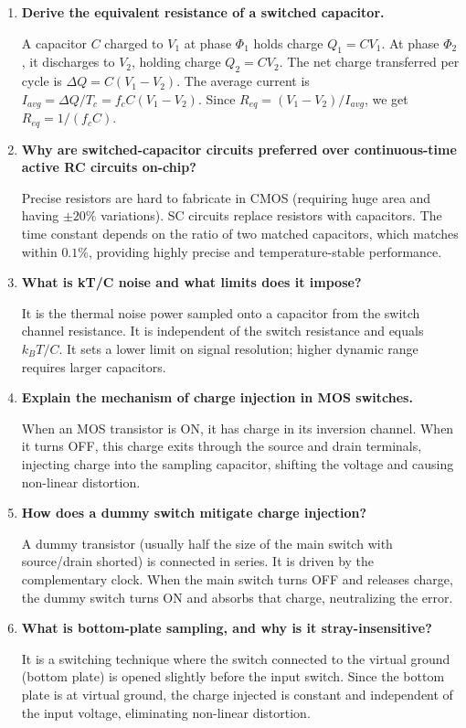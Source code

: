 \documentclass[12pt,a4paper]{article}
\newcommand{\Q}[1]{\textbf{#1}\par\noindent\ignorespaces}
\begin{document}
\begin{tcolorbox}[exambox, title={\textbf{Frequently Asked / Viva Questions}}]
\begin{enumerate}[topsep=0pt, label=\textbf{Q\arabic*.}, itemsep=5pt]
  \item \Q{Derive the equivalent resistance of a switched capacitor.}
    A capacitor $C$ charged to $V_1$ at phase $\Phi_1$ holds charge $Q_1 = C V_1$. At phase $\Phi_2$, it discharges to $V_2$, holding charge $Q_2 = C V_2$. The net charge transferred per cycle is $\Delta Q = C(V_1-V_2)$. The average current is $I_{avg} = \Delta Q / T_c = f_c C (V_1-V_2)$. Since $R_{eq} = (V_1-V_2)/I_{avg}$, we get $R_{eq} = 1/(f_c C)$.
  \item \Q{Why are switched-capacitor circuits preferred over continuous-time active RC circuits on-chip?}
    Precise resistors are hard to fabricate in CMOS (requiring huge area and having $\pm 20\%$ variations). SC circuits replace resistors with capacitors. The time constant depends on the ratio of two matched capacitors, which matches within $0.1\%$, providing highly precise and temperature-stable performance.
  \item \Q{What is kT/C noise and what limits does it impose?}
    It is the thermal noise power sampled onto a capacitor from the switch channel resistance. It is independent of the switch resistance and equals $k_B T / C$. It sets a lower limit on signal resolution; higher dynamic range requires larger capacitors.
  \item \Q{Explain the mechanism of charge injection in MOS switches.}
    When an MOS transistor is ON, it has charge in its inversion channel. When it turns OFF, this charge exits through the source and drain terminals, injecting charge into the sampling capacitor, shifting the voltage and causing non-linear distortion.
  \item \Q{How does a dummy switch mitigate charge injection?}
    A dummy transistor (usually half the size of the main switch with source/drain shorted) is connected in series. It is driven by the complementary clock. When the main switch turns OFF and releases charge, the dummy switch turns ON and absorbs that charge, neutralizing the error.
  \item \Q{What is bottom-plate sampling, and why is it stray-insensitive?}
    It is a switching technique where the switch connected to the virtual ground (bottom plate) is opened slightly before the input switch. Since the bottom plate is at virtual ground, the charge injected is constant and independent of the input voltage, eliminating non-linear distortion.

\end{enumerate}
\end{tcolorbox}
\end{document}

